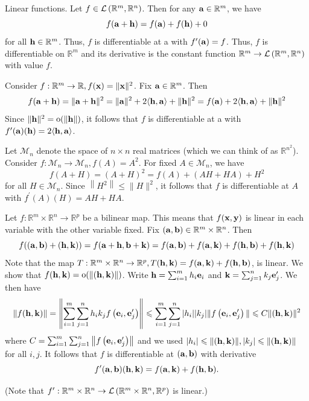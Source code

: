\documentclass[a4paper,11pt]{article}
\begin{document}
\begin{example}
    Linear functions. Let $f \in {\mathcal{L}}\left(\mathbb{R}^{m}, \mathbb{R}^{n}\right)$. Then for any ${\bf a} \in \mathbb{R}^{m}$, we have
    $$
f({\bf a}+{\bf h})=f({\bf a})+f({\bf h})+0
$$
for all ${\bf h} \in \mathbb{R}^{m}$. Thus, $f$ is differentiable at a with $f^{\prime}({\bf a})=f$. Thus, $f$ is differentiable on $\mathbb{R}^{m}$ and its derivative is the constant function $\mathbb{R}^{m} \rightarrow {\mathcal{L}}\left(\mathbb{R}^{m}, \mathbb{R}^{n}\right)$ with value $f$.
\end{example}
\begin{example}
    Consider $f: \mathbb{R}^{m} \rightarrow \mathbb{R}, f({\bf x})=\|{\bf x}\|^{2}$. Fix ${\bf a} \in \mathbb{R}^{m}$. Then
    $$
f({\bf a}+{\bf h})=\|{\bf a}+{\bf h}\|^{2}=\|{\bf a}\|^{2}+2\langle {\bf h}, {\bf a}\rangle+\|{\bf h}\|^{2}=f({\bf a})+2\langle {\bf h}, {\bf a}\rangle+\|{\bf h}\|^{2}
$$
Since $\|{\bf h}\|^{2}=\mathrm{o}(\|{\bf h}\|)$, it follows that $f$ is differentiable at a with $f^{\prime}({\bf a})({\bf h})=2\langle {\bf h}, {\bf a}\rangle$.
\end{example}

\begin{example}
    Let $\mathcal{M}_{n}$ denote the space of $n \times n$ real matrices (which we can think of as $\mathbb{R}^{n^{2}}$). Consider $f: \mathcal{M}_{n} \rightarrow \mathcal{M}_{n}, f(A)=A^{2}$. For fixed $A \in \mathcal{M}_{n}$, we have
$$
f(A+H)=(A+H)^{2}=f(A)+(A H+H A)+H^{2}
$$
for all $H \in \mathcal{M}_{n}$. Since $\left\|H^{2}\right\| \leqslant\|H\|^{2}$, it follows that $f$ is differentiable at $A$ with $f^{\prime}(A)(H)=A H+H A$.
\end{example}

\begin{example}
    Let $f: \mathbb{R}^{m} \times \mathbb{R}^{n} \rightarrow \mathbb{R}^{p}$ be a bilinear map. This means that $f({\bf x}, {\bf y})$ is linear in each variable with the other variable fixed. Fix $({\bf a}, {\bf b}) \in \mathbb{R}^{m} \times \mathbb{R}^{n}$. Then
    $$
f(({\bf a}, {\bf b})+({\bf h}, {\bf k}))=f({\bf a}+{\bf h}, {\bf b}+{\bf k})=f({\bf a}, {\bf b})+f({\bf a}, {\bf k})+f({\bf h}, {\bf b})+f({\bf h}, {\bf k})
$$
Note that the map $T: \mathbb{R}^{m} \times \mathbb{R}^{n} \rightarrow \mathbb{R}^{p}, T({\bf h}, {\bf k})=f({\bf a}, {\bf k})+f({\bf h}, {\bf b})$, is linear. We show that $f({\bf h}, {\bf k})=\mathrm{o}(\|({\bf h}, {\bf k})\|)$. Write ${\bf h}=\sum_{i=1}^{m} h_{i} {\bf e}_{i}$ and ${\bf k}=\sum_{j=1}^{n} k_{j} {\bf e}_{j}^{\prime}$. We then have
$$
\|f({\bf h}, {\bf k})\|=\left\|\sum_{i=1}^{m} \sum_{j=1}^{n} h_{i} k_{j} f\left({\bf e}_{i}, {\bf e}_{j}^{\prime}\right)\right\| \leqslant \sum_{i=1}^{m} \sum_{j=1}^{n} | h_{i}| |k_{j}| \|f\left({\bf e}_{i}, {\bf e}_{j}^{\prime}\right)\|\leqslant C\|({\bf h}, {\bf k}) \|^{2}
$$
where $C=\sum_{i=1}^{m} \sum_{j=1}^{n}\left\|f\left({\bf e}_{i}, {\bf e}_{j}^{\prime}\right)\right\|$ and we used $\left|h_{i}\right| \leqslant\|({\bf h}, {\bf k})\|,\left|k_{j}\right| \leqslant\|({\bf h}, {\bf k})\|$ for all $i, j$. It follows that $f$ is differentiable at $({\bf a}, {\bf b})$ with derivative 
\[
    f^{\prime}({\bf a}, {\bf b})({\bf h}, {\bf k})=f({\bf a}, {\bf k})+f({\bf h}, {\bf b}).
\]

(Note that $f^{\prime}: \mathbb{R}^{m} \times \mathbb{R}^{n} \rightarrow {\mathcal{L}}\left(\mathbb{R}^{m} \times \mathbb{R}^{n}, \mathbb{R}^{p}\right)$ is linear.)
\end{example}
\end{document}
